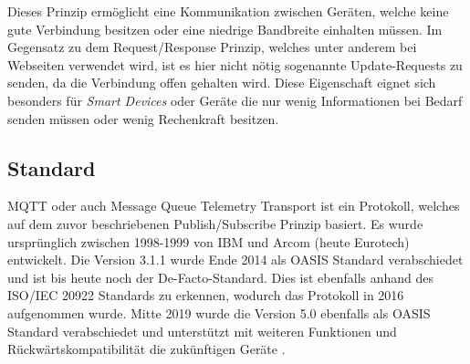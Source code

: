     Dieses Prinzip ermöglicht eine Kommunikation zwischen Geräten, welche keine gute Verbindung besitzen oder eine niedrige Bandbreite einhalten müssen. Im Gegensatz zu dem Request/Response Prinzip, welches unter anderem bei Webseiten verwendet wird, ist es hier nicht nötig sogenannte \glqq Update-Requests\grqq{} zu senden, da die Verbindung offen gehalten wird.
    Diese Eigenschaft eignet sich besonders für \emph{Smart Devices} oder Geräte die nur wenig Informationen bei Bedarf senden müssen oder wenig Rechenkraft besitzen.

    \subsection{Standard}
        \ac{MQTT} oder auch Message Queue Telemetry Transport ist ein Protokoll, welches auf dem zuvor beschriebenen Publish/Subscribe Prinzip basiert. Es wurde ursprünglich zwischen 1998-1999 von IBM und Arcom (heute Eurotech) entwickelt. Die Version 3.1.1 wurde Ende 2014 als OASIS Standard verabschiedet und ist bis heute noch der De-Facto-Standard. Dies ist ebenfalls anhand des ISO/IEC 20922 Standards zu erkennen, wodurch das Protokoll in 2016 aufgenommen wurde. \cite{eclipse_foundation2017} Mitte 2019 wurde die Version 5.0 ebenfalls als OASIS Standard verabschiedet und unterstützt mit weiteren Funktionen und Rückwärtskompatibilität die zukünftigen Geräte \cite{mqtt_org_2019}.
        
